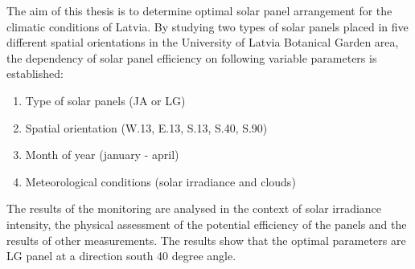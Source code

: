 The aim of this thesis is to determine optimal solar panel arrangement for the climatic conditions of Latvia.
By studying two types of solar panels placed in five different spatial orientations in the University of Latvia Botanical Garden area, the dependency of solar panel efficiency on following variable parameters is established:
\begin{enumerate}
\item Type of solar panels (JA or LG)
\item Spatial orientation (W.13, E.13, S.13, S.40, S.90)
\item Month of year (january - april)
\item Meteorological conditions (solar irradiance and clouds)
\end{enumerate}

The results of the monitoring are analysed in the context of solar irradiance intensity, the physical assessment of the potential efficiency of the panels and the results of other measurements.
The results show that the optimal parameters are LG panel at a direction south 40 degree angle.

